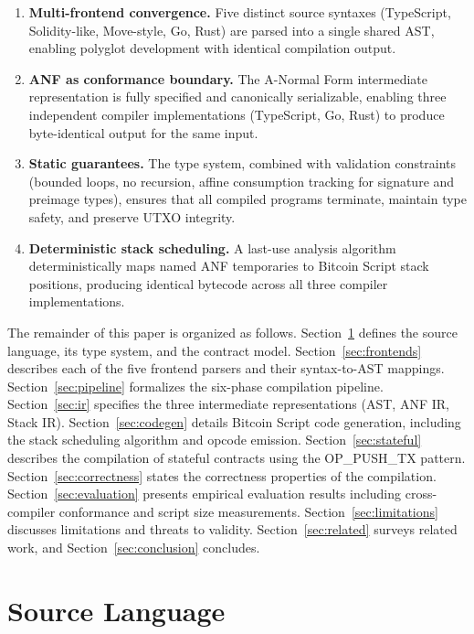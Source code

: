 \documentclass[11pt,a4paper]{article}
\begin{document}
\begin{enumerate}[label=(\roman*)]
  \item \textbf{Multi-frontend convergence.} Five distinct source syntaxes
    (TypeScript, Solidity-like, Move-style, Go, Rust) are parsed into a
    single shared AST, enabling polyglot development with identical
    compilation output.
  \item \textbf{ANF as conformance boundary.} The A-Normal Form intermediate
    representation is fully specified and canonically serializable, enabling
    three independent compiler implementations (TypeScript, Go, Rust) to
    produce byte-identical output for the same input.
  \item \textbf{Static guarantees.} The type system, combined with validation
    constraints (bounded loops, no recursion, affine consumption tracking
    for signature and preimage types), ensures that all compiled programs
    terminate, maintain type safety, and preserve UTXO integrity.
  \item \textbf{Deterministic stack scheduling.} A last-use analysis algorithm
    deterministically maps named ANF temporaries to Bitcoin Script stack
    positions, producing identical bytecode across all three compiler
    implementations.
\end{enumerate}

The remainder of this paper is organized as follows. Section~\ref{sec:language}
defines the source language, its type system, and the contract model.
Section~\ref{sec:frontends} describes each of the five frontend parsers and
their syntax-to-AST mappings. Section~\ref{sec:pipeline} formalizes the
six-phase compilation pipeline. Section~\ref{sec:ir} specifies the three
intermediate representations (AST, ANF IR, Stack IR).
Section~\ref{sec:codegen} details Bitcoin Script code generation, including
the stack scheduling algorithm and opcode emission.
Section~\ref{sec:stateful} describes the compilation of stateful contracts
using the OP\_PUSH\_TX pattern. Section~\ref{sec:correctness} states the
correctness properties of the compilation. Section~\ref{sec:evaluation}
presents empirical evaluation results including cross-compiler conformance
and script size measurements. Section~\ref{sec:limitations} discusses
limitations and threats to validity. Section~\ref{sec:related} surveys
related work, and Section~\ref{sec:conclusion} concludes.

\section{Source Language}
\label{sec:language}
\end{document}

